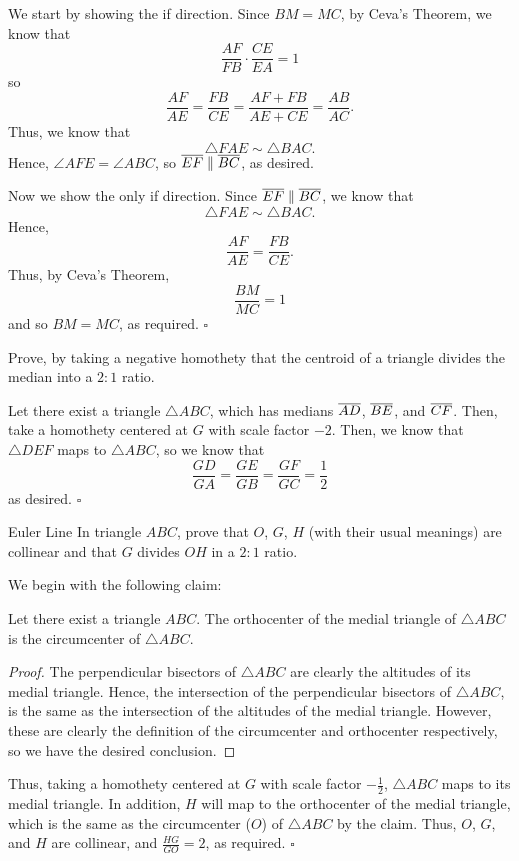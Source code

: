 \documentclass{article}
\begin{document}
We start by showing the if direction. Since $BM = MC$, by Ceva's Theorem, we know that \[\dfrac{AF}{FB}\cdot\dfrac{CE}{EA} = 1\] so \[\dfrac{AF}{AE} = \dfrac{FB}{CE} = \dfrac{AF+FB}{AE+CE} = \dfrac{AB}{AC}.\] Thus, we know that \[\triangle FAE \sim \triangle BAC.\] Hence, $\angle AFE = \angle ABC$, so $\overline{EF}\parallel\overline{BC}$, as desired.

Now we show the only if direction. Since $\overline{EF}\parallel\overline{BC}$, we know that \[\triangle FAE \sim \triangle BAC.\] Hence, \[\dfrac{AF}{AE} = \dfrac{FB}{CE}.\] Thus, by Ceva's Theorem, \[\dfrac{BM}{MC} = 1\] and so $BM = MC$, as required. $\square$

\begin{problem}[3.12]{}
Prove, by taking a negative homothety that the centroid of a triangle divides the median into a $2:1$ ratio.
\end{problem}

Let there exist a triangle $\triangle ABC$, which has medians $\overline{AD}$, $\overline{BE}$, and $\overline{CF}$. Then, take a homothety centered at $G$ with scale factor $-2$. Then, we know that $\triangle DEF$ maps to $\triangle ABC$, so we know that \[\dfrac{GD}{GA} = \dfrac{GE}{GB} = \dfrac{GF}{GC} = \dfrac{1}{2}\] as desired. $\square$

\begin{problem}[3.13]{Euler Line}
In triangle $ABC$, prove that $O$, $G$, $H$ (with their usual meanings) are collinear and that $G$ divides $OH$ in a $2:1$ ratio.
\end{problem}

We begin with the following claim:
\begin{claim*}
Let there exist a triangle $ABC$. The orthocenter of the medial triangle of $\triangle ABC$ is the circumcenter of $\triangle ABC$.
\end{claim*}
\begin{proof}
The perpendicular bisectors of $\triangle ABC$ are clearly the altitudes of its medial triangle. Hence, the intersection of the perpendicular bisectors of $\triangle ABC$, is the same as the intersection of the altitudes of the medial triangle. However, these are clearly the definition of the circumcenter and orthocenter respectively, so we have the desired conclusion.
\end{proof}

Thus, taking a homothety centered at $G$ with scale factor $-\tfrac{1}{2}$, $\triangle ABC$ maps to its medial triangle. In addition, $H$ will map to the orthocenter of the medial triangle, which is the same as the circumcenter ($O$) of $\triangle ABC$ by the claim. Thus, $O$, $G$, and $H$ are collinear, and $\frac{HG}{GO} = 2$, as required. $\square$
\end{document}
